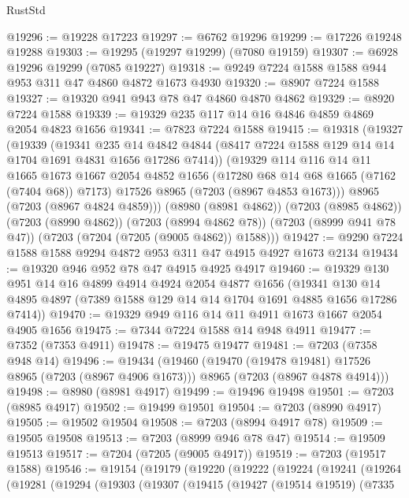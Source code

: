 \begin{lexlean}{RustStd}
\begin{coremodule}
@19296 := @19228 @17223
@19297 := @6762 @19296
@19299 := @17226 @19248 @19288
@19303 := @19295 (@19297 @19299) (@7080 @19159)
@19307 := @6928 @19296 @19299 (@7085 @19227)
@19318 := @9249 @7224 @1588 @1588 @944 @953 @311 @47 @4860 @4872 @1673 @4930
@19320 := @8907 @7224 @1588
@19327 := @19320 @941 @943 @78 @47 @4860 @4870 @4862
@19329 := @8920 @7224 @1588
@19339 := @19329 @235 @117 @14 @16 @4846 @4859 @4869 @2054 @4823 @1656
@19341 := @7823 @7224 @1588
@19415 := @19318
    (@19327
      (@19339
        (@19341
          @235
          @14
          @4842
          @4844
          (@8417 @7224 @1588 @129 @14 @14 @1704 @1691 @4831 @1656 @17286 @7414))
        (@19329
          @114
          @116
          @14
          @11
          @1665
          @1673
          @1667
          @2054
          @4852
          @1656
          (@17280 @68 @14 @68 @1665 (@7162 (@7404 @68)) @7173)
          @17526
          @8965
          (@7203 (@8967 @4853 @1673)))
        @8965
        (@7203 (@8967 @4824 @4859)))
      (@8980 (@8981 @4862))
      (@7203 (@8985 @4862))
      (@7203 (@8990 @4862))
      (@7203 (@8994 @4862 @78))
      (@7203 (@8999 @941 @78 @47))
      (@7203 (@7204 (@7205 (@9005 @4862)) @1588)))
@19427 := @9290 @7224 @1588 @1588 @9294 @4872 @953 @311 @47 @4915 @4927 @1673 @2134
@19434 := @19320 @946 @952 @78 @47 @4915 @4925 @4917
@19460 := @19329
    @130
    @951
    @14
    @16
    @4899
    @4914
    @4924
    @2054
    @4877
    @1656
    (@19341 @130 @14 @4895 @4897 (@7389 @1588 @129 @14 @14 @1704 @1691 @4885 @1656 @17286 @7414))
@19470 := @19329 @949 @116 @14 @11 @4911 @1673 @1667 @2054 @4905 @1656
@19475 := @7344 @7224 @1588 @14 @948 @4911
@19477 := @7352 (@7353 @4911)
@19478 := @19475 @19477
@19481 := @7203 (@7358 @948 @14)
@19496 := @19434
    (@19460
      (@19470 (@19478 @19481) @17526 @8965 (@7203 (@8967 @4906 @1673)))
      @8965
      (@7203 (@8967 @4878 @4914)))
@19498 := @8980 (@8981 @4917)
@19499 := @19496 @19498
@19501 := @7203 (@8985 @4917)
@19502 := @19499 @19501
@19504 := @7203 (@8990 @4917)
@19505 := @19502 @19504
@19508 := @7203 (@8994 @4917 @78)
@19509 := @19505 @19508
@19513 := @7203 (@8999 @946 @78 @47)
@19514 := @19509 @19513
@19517 := @7204 (@7205 (@9005 @4917))
@19519 := @7203 (@19517 @1588)
@19546 := @19154
    (@19179
      (@19220
        (@19222
          (@19224
            (@19241
              (@19264
                (@19281
                  (@19294
                    (@19303
                      (@19307
                        (@19415
                          (@19427
                            (@19514 @19519)
                            (@7335

\end{coremodule}
\end{lexlean}
